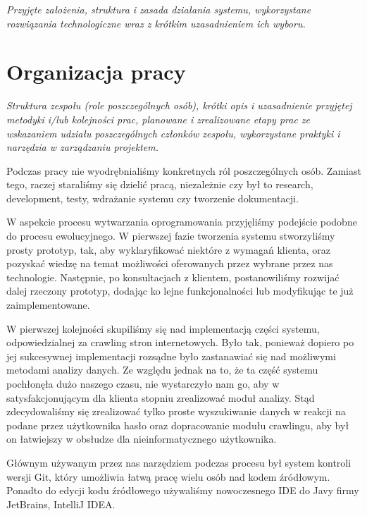 \documentclass[polish,12pt]{aghthesis}
\begin{document}
\emph{Przyjęte założenia, struktura i zasada działania systemu,
  wykorzystane rozwiązania technologiczne wraz z krótkim uzasadnieniem
  ich wyboru.}

\section{Organizacja pracy}
\label{sec:organizacja-pracy}

\emph{Struktura zespołu (role poszczególnych osób), krótki opis i
  uzasadnienie przyjętej metodyki i/lub kolejności prac, planowane i
  zrealizowane etapy prac ze wskazaniem udziału poszczególnych
  członków zespołu, wykorzystane praktyki i narzędzia w zarządzaniu
  projektem.}

Podczas pracy nie wyodrębnialiśmy konkretnych ról poszczególnych osób. Zamiast tego, raczej staraliśmy się dzielić pracą, niezależnie czy
był to
research, development, testy, wdrażanie systemu czy tworzenie dokumentacji.

W aspekcie procesu wytwarzania oprogramowania przyjęliśmy podejście podobne do procesu ewolucyjnego. W pierwszej fazie tworzenia systemu 
stworzyliśmy prosty prototyp, tak, aby wyklaryfikować niektóre z wymagań klienta, oraz pozyskać wiedzę na temat możliwości oferowanych
przez wybrane przez nas technologie. Następnie, po konsultacjach z klientem, postanowiliśmy rozwijać dalej rzeczony prototyp, dodając ko
lejne funkcjonalności lub modyfikując te już zaimplementowane. 

W pierwszej kolejności skupiliśmy się nad implementacją części systemu, odpowiedzialnej za crawling stron internetowych. Było tak, ponieważ
dopiero po jej sukcesywnej implementacji rozsądne było zastanawiać się nad możliwymi metodami analizy danych. Ze względu jednak na to, że 
ta część systemu pochłonęła dużo naszego czasu, nie wystarczyło nam go, aby w satysfakcjonującym dla klienta stopniu zrealizować moduł analizy.
Stąd zdecydowaliśmy się zrealizować tylko proste wyszukiwanie danych w reakcji na podane przez użytkownika hasło oraz dopracowanie modułu crawlingu,
aby był on łatwiejszy w obsłudze dla nieinformatycznego użytkownika. 

Głównym używanym przez nas narzędziem podczas procesu był system kontroli wersji Git, który umożliwia łatwą pracę wielu osób nad kodem źródłowym.
Ponadto do edycji kodu źródłowego używaliśmy nowoczesnego IDE do Javy firmy JetBrains, IntelliJ IDEA.
\end{document}
